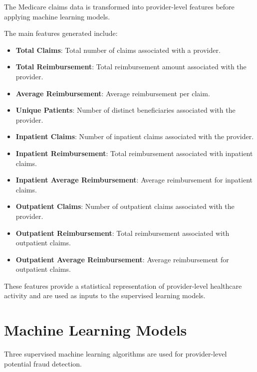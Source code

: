 The Medicare claims data is transformed into provider-level features before applying machine learning models.

The main features generated include:

\begin{itemize}

\item \textbf{Total Claims}: Total number of claims associated with a provider.

\item \textbf{Total Reimbursement}: Total reimbursement amount associated with the provider.

\item \textbf{Average Reimbursement}: Average reimbursement per claim.

\item \textbf{Unique Patients}: Number of distinct beneficiaries associated with the provider.

\item \textbf{Inpatient Claims}: Number of inpatient claims associated with the provider.

\item \textbf{Inpatient Reimbursement}: Total reimbursement associated with inpatient claims.

\item \textbf{Inpatient Average Reimbursement}: Average reimbursement for inpatient claims.

\item \textbf{Outpatient Claims}: Number of outpatient claims associated with the provider.

\item \textbf{Outpatient Reimbursement}: Total reimbursement associated with outpatient claims.

\item \textbf{Outpatient Average Reimbursement}: Average reimbursement for outpatient claims.

\end{itemize}

These features provide a statistical representation of provider-level healthcare activity and are used as inputs to the supervised learning models.

\section{Machine Learning Models}

Three supervised machine learning algorithms are used for provider-level potential fraud detection.

